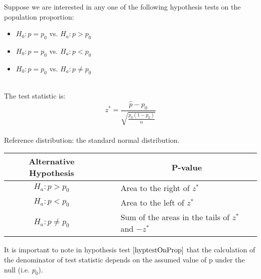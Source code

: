 \begin{hyp}\label{hyptestOnProp}
Suppose we are interested in any one of the following hypothesis tests
on the population proportion:\\

\begin{itemize}
\item	$H_{0} : p = p_{0}$  vs. $H_{a}  : p > p_{0}$
\item	$H_{0} : p = p_{0}$  vs. $H_{a}  : p < p_{0}$
\item	$H_{0} : p = p_{0}$  vs. $H_{a}  : p \neq p_{0}$
\end{itemize}

\hfill\\
The test statistic is: %
\begin{equation}\label{eqnCISigmaKnown}
z^{*}	= \displaystyle\frac{ \hat{p} - p_{0} }{   \sqrt{ \displaystyle\frac{p_{0}(1 - p_{0})}{n}  }  }
\end{equation}
\hfill\\
Reference distribution: the standard normal distribution.\\

\begin{center}
\begin{tabular}{ccl}
Alternative Hypothesis	&	~\quad~	&	\multicolumn{1}{c}{P-value}	\\
\hline
$H_{a}  : p > p_{0}$		&	&	Area to the right of $z^{*}$	\\
$H_{a}  : p < p_{0}$		&	&	Area to the left of $z^{*}$	\\
$H_{a}  : p \neq p_{0}$	&	&	Sum of the areas in the tails of $z^{*}$ and $-z^{*}$
\end{tabular}
\end{center}

\end{hyp}





\begin{nt}
It is important to note in hypothesis test $\ref{hyptestOnProp}$
that the calculation of the denominator of test statistic depends on the assumed value of p
under the null (i.e. $p_{0}$).
\end{nt}



